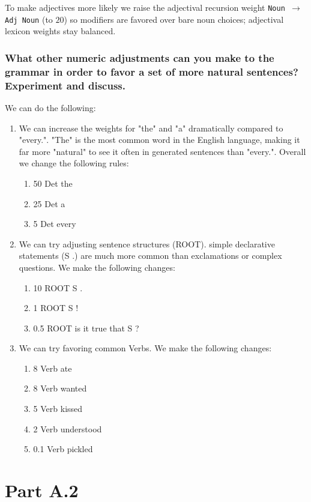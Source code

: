 \documentclass{article}
\begin{document}
To make adjectives more likely we raise the adjectival recursion weight \texttt{Noun $\to$ Adj Noun} (to $20$) so modifiers are favored over bare noun choices; adjectival lexicon weights stay balanced.


\subsubsection*{What other numeric adjustments can you make to the grammar in order to favor a set of more natural sentences? Experiment and discuss.}

We can do the following:

\begin{enumerate}
    \item We can increase the weights for "the" and "a" dramatically compared to "every.". "The" is the most common word in the English language, making it far more "natural" to see it often in generated sentences than "every.". Overall we change the following rules:
    \begin{enumerate}
        \item 50	Det	the
        \item 25	Det	a
        \item 5	Det	every
    \end{enumerate}
    \item We can try adjusting sentence structures (ROOT). simple declarative statements (S .) are much more common than exclamations or complex questions. We make the following changes:
    \begin{enumerate}
        \item 10	ROOT	S .
        \item 1	ROOT	S !
        \item 0.5	ROOT	is it true that S ? 
    \end{enumerate}
    \item We can try favoring common Verbs. We make the following changes:
    \begin{enumerate}
        \item 8	Verb	ate
        \item 8	Verb	wanted
        \item 5	Verb	kissed
        \item 2	Verb	understood
        \item 0.1	Verb	pickled
    \end{enumerate}
\end{enumerate}


\section*{Part A.2}
\end{document}
